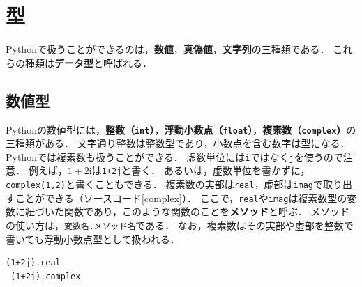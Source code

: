\documentclass[a4paper,12pt]{jsarticle}
\begin{document}
\section{型}

Pythonで扱うことができるのは，{\bf 数値}，{\bf 真偽値}，{\bf 文字列}の三種類である．
これらの種類は{\bf データ型}と呼ばれる．


\subsection{数値型}

Pythonの数値型には，{\bf 整数（\texttt{int}）}，{\bf 浮動小数点（\texttt{float}）}，{\bf 複素数（\texttt{complex}）}の三種類がある．
文字通り整数は整数型であり，小数点を含む数字は型になる．
Pythonでは複素数も扱うことができる．
虚数単位には\texttt{i}ではなく\texttt{j}を使うので注意．
例えば，$1+2\mathrm{i}$は\texttt{1+2j}と書く．
あるいは，虚数単位を書かずに，\texttt{complex(1,2)}と書くこともできる．
複素数の実部は\texttt{real}，虚部は\texttt{imag}で取り出すことができる（ソースコード\ref{complex}）．
ここで，\texttt{real}や\texttt{imag}は複素数型の変数に紐づいた関数であり，このような関数のことを{\bf メソッド}と呼ぶ．
メソッドの使い方は，\texttt{変数名.メソッド名}である．
なお，複素数はその実部や虚部を整数で書いても浮動小数点型として扱われる．
\begin{lstlisting}[caption=複素数の実部，虚部を取り出す,label=complex]
 (1+2j).real
 (1+2j).complex
\end{lstlisting}
\end{document}
